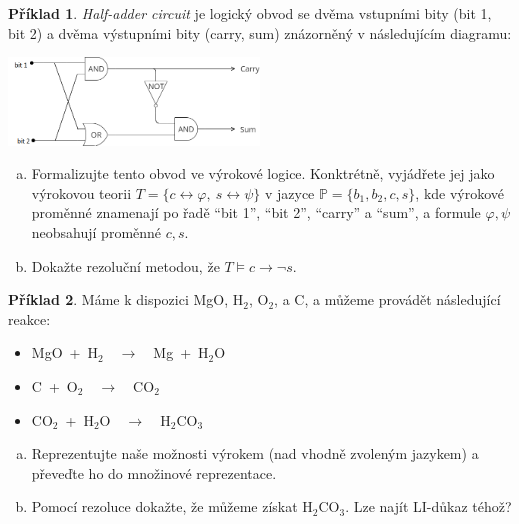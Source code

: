 \documentclass[a4paper]{article}
\theoremstyle{definition}
\newtheorem{problem}{Příklad}
\begin{document}
\medskip\begin{problem}
\emph{Half-adder circuit} je logický obvod se dvěma vstupními bity (bit 1, bit 2) a dvěma výstupními bity (carry, sum) znázorněný v následujícím diagramu:
\begin{center}
    \includegraphics[width=0.5\textwidth]{files/half-adder.png}
\end{center}
\begin{enumerate}[(a)]
        \item Formalizujte tento obvod ve výrokové logice. Konktrétně, vyjádřete jej jako výrokovou teorii $T=\{c\leftrightarrow \varphi,\ s\leftrightarrow \psi\}$ v jazyce $\mathbb P=\{b_1,b_2,c,s\}$, kde výrokové proměnné znamenají po řadě ``bit 1'', ``bit 2'', ``carry'' a ``sum'', a formule $\varphi,\psi$ neobsahují proměnné $c,s$.
        \item Dokažte rezoluční metodou, že $T\models c\to\neg s$.
\end{enumerate}
\end{problem}


\medskip\begin{problem} Máme k dispozici MgO, H$_2$, O$_2$, a C, a můžeme provádět následující reakce:
    \begin{itemize}
        \item MgO\ +\ H$_2$\ \ $\to$\ \ Mg\ +\ H$_2$O
        \item C\ +\ O$_2$\ \ $\to$\ \ CO$_2$
        \item CO$_2$\ +\ H$_2$O\ \ $\to$\ \ H$_2$CO$_3$
    \end{itemize}
    \begin{enumerate}[(a)]
        \item Reprezentujte naše možnosti výrokem (nad vhodně zvoleným jazykem) a převeďte ho do množinové reprezentace.
        \item Pomocí rezoluce dokažte, že můžeme získat H$_2$CO$_3$. Lze najít LI-důkaz téhož?
    \end{enumerate}
\end{problem}
\end{document}
